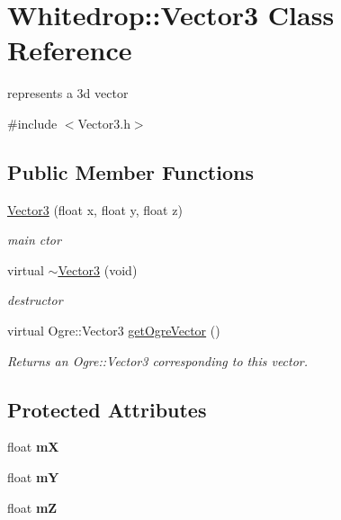 \hypertarget{class_whitedrop_1_1_vector3}{\section{Whitedrop\+:\+:Vector3 Class Reference}
\label{class_whitedrop_1_1_vector3}
}


represents a 3d vector  




{\ttfamily \#include $<$Vector3.\+h$>$}

\subsection*{Public Member Functions}
\begin{DoxyCompactItemize}
\item 
\hyperlink{class_whitedrop_1_1_vector3_aeb98c9bcbd47a34491c7a5b9f35115fc}{Vector3} (float x, float y, float z)
\begin{DoxyCompactList}\small\item\em main ctor \end{DoxyCompactList}\item 
\hypertarget{class_whitedrop_1_1_vector3_aafe3578a38c9d25d22500c2b7272133f}{virtual \hyperlink{class_whitedrop_1_1_vector3_aafe3578a38c9d25d22500c2b7272133f}{$\sim$\+Vector3} (void)}\label{class_whitedrop_1_1_vector3_aafe3578a38c9d25d22500c2b7272133f}

\begin{DoxyCompactList}\small\item\em destructor \end{DoxyCompactList}\item 
virtual Ogre\+::\+Vector3 \hyperlink{class_whitedrop_1_1_vector3_a920592ff8b17880b2fac6e1f99da5d7b}{get\+Ogre\+Vector} ()
\begin{DoxyCompactList}\small\item\em Returns an Ogre\+::\+Vector3 corresponding to this vector. \end{DoxyCompactList}\end{DoxyCompactItemize}
\subsection*{Protected Attributes}
\begin{DoxyCompactItemize}
\item 
\hypertarget{class_whitedrop_1_1_vector3_a8c05931f2473585c1bb932e01b92d09f}{float {\bfseries m\+X}}\label{class_whitedrop_1_1_vector3_a8c05931f2473585c1bb932e01b92d09f}

\item 
\hypertarget{class_whitedrop_1_1_vector3_a108f0ba5d85248911d5f7ebf8109e511}{float {\bfseries m\+Y}}\label{class_whitedrop_1_1_vector3_a108f0ba5d85248911d5f7ebf8109e511}

\item 
\hypertarget{class_whitedrop_1_1_vector3_a4361fef03d39e6216e5666ff183d2527}{float {\bfseries m\+Z}}\label{class_whitedrop_1_1_vector3_a4361fef03d39e6216e5666ff183d2527}

\end{DoxyCompactItemize}


